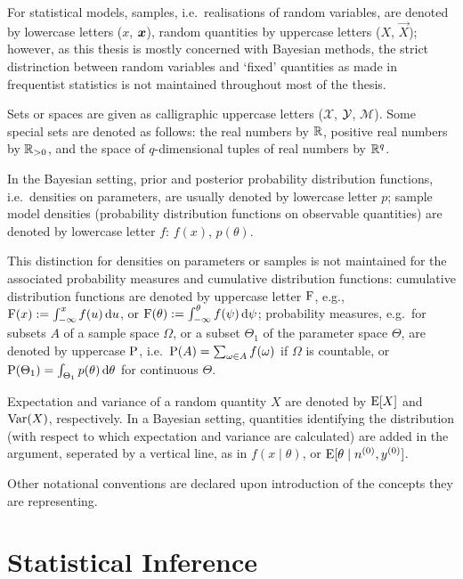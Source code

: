 For statistical models, samples, i.e.\ realisations of random variables,
are denoted by lowercase letters ($x$, ${\bm x}$),
random quantities by uppercase letters ($X$, $\vec{X}$);
however, as this thesis is mostly concerned with Bayesian methods,
the strict distrinction between random variables and `fixed' quantities as made in frequentist statistics
is not maintained throughout most of the thesis.

Sets or spaces are given as calligraphic uppercase letters ($\mathcal{X}$, $\mathcal{Y}$, $\mathcal{M}$).
Some special sets are denoted as follows:
the real numbers by $\mathbb{R}$, positive real numbers by $\mathbb{R}_{>0}$,
and the space of $q$-dimensional tuples of real numbers by $\mathbb{R}^q$.

In the Bayesian setting, prior and posterior probability distribution functions, i.e.\ densities on parameters,
are usually denoted by lowercase letter $p$;
sample model densities (probability distribution functions on observable quantities)
are denoted by lowercase letter $f$:
$f(x)$, $p(\theta)$.

This distinction for densities on parameters or samples
is not maintained for the associated probability measures and cumulative distribution functions:
cumulative distribution functions are denoted by uppercase letter $\operatorname{F}$,
e.g., $\operatorname{F}(x) := \int_{-\infty}^x f(u) \,\mathrm{d} u$, or $\operatorname{F}(\theta) := \int_{-\infty}^\theta f(\psi) \,\mathrm{d} \psi$;
probability measures, e.g.\ for subsets $A$ of a sample space $\Omega$,
or a subset $\Theta_1$ of the parameter space $\Theta$,
are denoted by uppercase $\operatorname{P}$,
i.e.\ $\operatorname{P}(A) = \sum_{\omega \in A} f(\omega)$ if $\Omega$ is countable,
or $\operatorname{P}(\Theta_1) = \int_{\Theta_1} p(\theta) \,\mathrm{d} \theta$ for continuous $\Theta$.

Expectation and variance of a random quantity $X$ are denoted by $\operatorname{E}[X]$ and $\operatorname{Var}(X)$, respectively.
In a Bayesian setting, quantities identifying the distribution
(with respect to which expectation and variance are calculated)
are added in the argument, seperated by a vertical line, as in $f(x\mid\theta)$, or $\operatorname{E}[\theta\mid n^{(0)}, y^{(0)}]$.

Other notational conventions are declared upon introduction of the concepts they are representing.


\section{Statistical Inference}
\label{sec:stat-inference}

